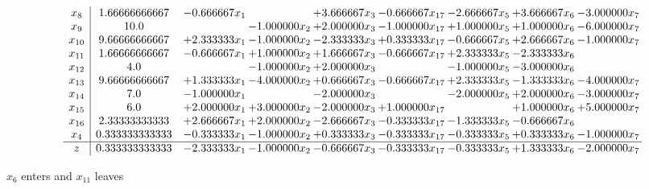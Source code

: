 \documentclass[10pt]{article}
\begin{document}
 \[\begin{array}{c| c c@{\hskip 2pt} c@{\hskip 2pt} c@{\hskip 2pt} c@{\hskip 2pt} c@{\hskip 2pt} c@{\hskip 2pt} c@{\hskip 2pt} }
 x_{8}   &  1.66666666667 & -0.666667 x_{1} &   & + 3.666667 x_{3} & -0.666667 x_{17} & -2.666667 x_{5} & + 3.666667 x_{6} & -3.000000 x_{7}\\
 x_{9}   &  10.0  &   & -1.000000 x_{2} & + 2.000000 x_{3} & -1.000000 x_{17} & + 1.000000 x_{5} & + 1.000000 x_{6} & -6.000000 x_{7}\\
 x_{10}   &  9.66666666667 & + 2.333333 x_{1} & -1.000000 x_{2} & -2.333333 x_{3} & + 0.333333 x_{17} & -0.666667 x_{5} & + 2.666667 x_{6} & -1.000000 x_{7}\\
 x_{11}   &  1.66666666667 & -0.666667 x_{1} & + 1.000000 x_{2} & + 1.666667 x_{3} & -0.666667 x_{17} & + 2.333333 x_{5} & -2.333333 x_{6} &   \\
 x_{12}   &  4.0  &   & -1.000000 x_{2} & + 2.000000 x_{3} &   & -1.000000 x_{5} & -3.000000 x_{6} &   \\
 x_{13}   &  9.66666666667 & + 1.333333 x_{1} & -4.000000 x_{2} & + 0.666667 x_{3} & -0.666667 x_{17} & + 2.333333 x_{5} & -1.333333 x_{6} & -4.000000 x_{7}\\
 x_{14}   &  7.0 & -1.000000 x_{1} &   & -2.000000 x_{3} &   & -2.000000 x_{5} & + 2.000000 x_{6} & -3.000000 x_{7}\\
 x_{15}   &  6.0 & + 2.000000 x_{1} & + 3.000000 x_{2} & -2.000000 x_{3} & + 1.000000 x_{17} &   & + 1.000000 x_{6} & + 5.000000 x_{7}\\
 x_{16}   &  2.33333333333 & + 2.666667 x_{1} & + 2.000000 x_{2} & -2.666667 x_{3} & -0.333333 x_{17} & -1.333333 x_{5} & -0.666667 x_{6} &   \\
 x_{4}   &  0.333333333333 & -0.333333 x_{1} & -1.000000 x_{2} & + 0.333333 x_{3} & -0.333333 x_{17} & -0.333333 x_{5} & + 0.333333 x_{6} & -1.000000 x_{7}\\
\hline
z    &  0.333333333333 & -2.333333 x_{1} & -1.000000 x_{2} & -0.666667 x_{3} & -0.333333 x_{17} & -0.333333 x_{5} & + 1.333333 x_{6} & -2.000000 x_{7}\\
\end{array}\]


 $ x_{6} $ enters and $ x_{11} $ leaves 
\end{document}
